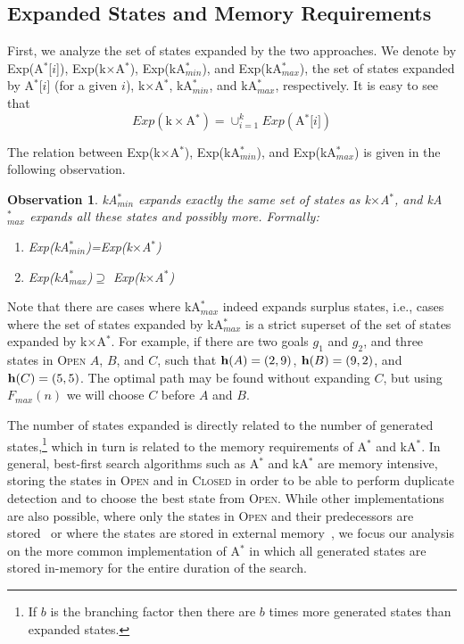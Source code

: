 \documentclass{aicom2e}
\newtheorem{observation}{Observation}
\newcommand{\astar}{A$^*$}
\newcommand{\kastar}{kA$^*$}
\newcommand{\kastarmin}{kA$^*_{min}$}
\newcommand{\kastarmax}{kA$^*_{max}$}
\newcommand{\kxastar}{k$\times$A$^*$}
\newcommand{\astari}[1]{A$^*$[$#1$]}
\newcommand{\maxf}{$F_{max}(n)$}
\newcommand{\open}{\textsc{Open}}
\newcommand{\closed}{\textsc{Closed}}
\newcommand{\roni}[1]{\textbf{[RS:#1]}}
\begin{document}
\subsection{Expanded States and Memory Requirements}
First, we analyze the set of states expanded by the two approaches.
We denote by Exp(\astari{i}), Exp(\kxastar{}), Exp(\kastarmin), and Exp(\kastarmax),
the set of states expanded by \astari{i} (for a given $i$), \kxastar{}, \kastarmin, and \kastarmax{}, respectively. It is easy to see that
\[ Exp(\text{\kxastar{}})=\cup_{i=1}^k Exp(\text{\astari{i}}) \]

The relation between Exp(\kxastar{}), Exp(\kastarmin), and Exp(\kastarmax) is given in the following observation.
\begin{observation}
    \kastarmin{} expands exactly the same set of states as \kxastar{},
    and \kastarmax{} expands all these states and possibly more. Formally:
    \begin{enumerate}
        \item Exp(\kastarmin{})=Exp(\kxastar{})
        \item Exp(\kastarmax{})$\supseteq$ Exp(\kxastar{})
    \end{enumerate}
\label{obs:expandedStates}
\end{observation}

Note that there are cases where \kastarmax{} indeed expands surplus states, 
i.e., cases where the set of states
expanded by \kastarmax{} is a strict superset of the set of states expanded by
\kxastar{}. For example, if there are two goals $g_1$ and $g_2$, and three
states in \open{} $A$, $B$, and $C$, such that ${\bf h}(A)=(2,9)$, ${\bf
h}(B)=(9,2)$, and ${\bf h}(C)=(5,5)$. The optimal path may be found without
expanding $C$, but using \maxf{} we will choose $C$ before $A$ and $B$.



The number of states expanded is directly related to the number of generated
states,\footnote{If $b$ is the branching factor then there are $b$ times more
	generated states than expanded states.} which in turn is related to the memory
requirements of \astar{} and \kastar{}. In general, best-first search
algorithms such as \astar{} and \kastar{} are memory intensive, storing the
states in \open{} and in \closed{} in order to be able to perform duplicate
detection and to choose the best state from \open{}. While other
implementations are also possible, where only the states in \open{} and their
predecessors are stored~\cite{zhou2006breadth,korf2004best} or where the states
are stored in external
memory~\cite{zhou2004structured,edelkamp2016external,edelkamp2005external}, we
focus our analysis on the more common implementation of \astar{} in which all
generated states are stored in-memory for the entire duration of the search.
\end{document}
